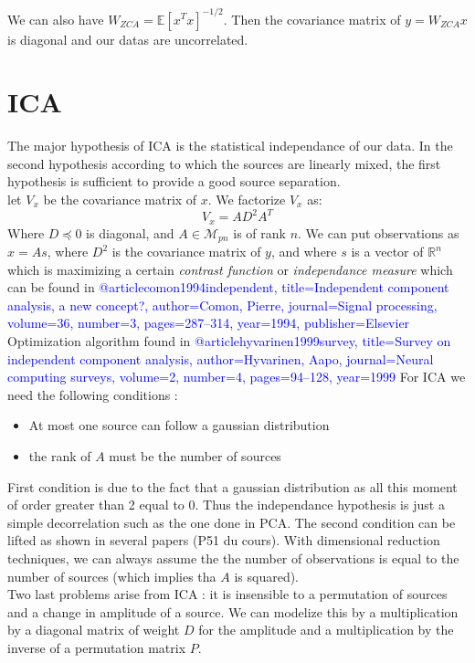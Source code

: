 \documentclass[a4paper,11pt,titlepage]{article}
\begin{document}
We can also have $W_{ZCA} = \mathds{E}[x^Tx]^{-1/2}$. Then the covariance matrix of $y = W_{ZCA}x$ is diagonal and our datas are uncorrelated. 
\section{ICA}
The major hypothesis of ICA is the statistical independance of our data. In the second hypothesis according to which the sources are linearly mixed, the first hypothesis is sufficient to provide a good source separation. \\
let $V_x$ be the covariance matrix of $x$. We factorize $V_x$ as:
\begin{equation*}
	V_x = AD^2A^T
\end{equation*}
Where $D \preccurlyeq 0$ is diagonal, and $A \in \mathcal{M}_{pn}$ is of rank $n$. We can put observations as $x = As$, where $D^2$ is the covariance matrix of $y$, and where $s$ is a vector of $\mathds{R}^n$ which is maximizing a certain \textit{contrast function} or \textit{independance measure} which can be found in \textcolor{blue}{@article{comon1994independent,
  title={Independent component analysis, a new concept?},
    author={Comon, Pierre},
  journal={Signal processing},
    volume={36},
  number={3},
    pages={287--314},
  year={1994},
    publisher={Elsevier}
}}
\\
Optimization algorithm found in \textcolor{blue}{@article{hyvarinen1999survey,
	  title={Survey on independent component analysis},
	    author={Hyvarinen, Aapo},
		  journal={Neural computing surveys},
		    volume={2},
			  number={4},
			    pages={94--128},
				  year={1999}
			  }}
For ICA we need the following conditions :
\begin{itemize}
	\item At most one source can follow a gaussian distribution
	\item the rank of $A$ must be the number of sources
\end{itemize}
First condition is due to the fact that a gaussian distribution as all this moment of order greater than 2 equal to 0. Thus the independance hypothesis is just a simple decorrelation such as the one done in PCA. The second condition can be lifted as shown in several papers (P51 du cours).
With dimensional reduction techniques, we can always assume the the number of observations is equal to the number of sources (which implies tha $A$ is squared). 
\\
Two last problems arise from ICA : it is insensible to a permutation of sources and a change in amplitude of a source. We can modelize this by a multiplication by a diagonal matrix of weight $D$ for the amplitude and a multiplication by the inverse of a permutation matrix $P$.
\end{document}
